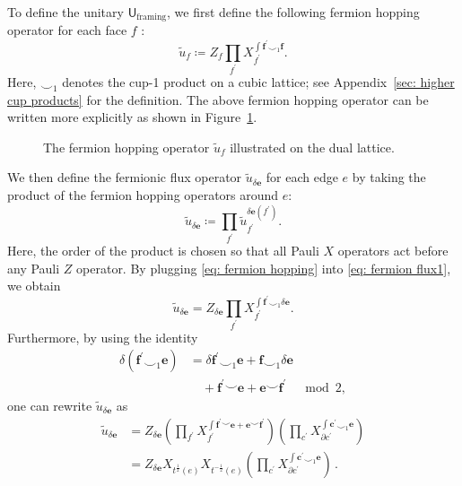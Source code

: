 \documentclass[aps,twocolumn,prx,floatfix,preprintnumbers, nofootinbib,10pt]{revtex4-2}
\numberwithin{equation}{section}
\theoremstyle{definition}
\theoremstyle{remark}
\theoremstyle{claim}
\renewcommand{\sf}[1]{\mathsf{#1}}
\begin{document}
To define the unitary $\sf{U}_{\text{framing}}$, we first define the following fermion hopping operator for each face $f$ \cite{Chen:2018nog, Shirley_2022}:
\begin{equation}
\tilde{u}_f \coloneq Z_f \prod_{f^{\prime}} X_{f^{\prime}}^{\int \bm{f}^{\prime} \smile_1 \bm{f}}.
\label{eq: fermion hopping}
\end{equation}
Here, $\smile_1$ denotes the cup-1 product on a cubic lattice; see Appendix~\ref{sec: higher cup products} for the definition.
The above fermion hopping operator can be written more explicitly as shown in Figure~\ref{fig: fermion hopping}.
\begin{figure}[t]
\centering
{}
\caption{The fermion hopping operator $\tilde{u}_f$ illustrated on the dual lattice.}
\label{fig: fermion hopping}
\end{figure}
We then define the fermionic flux operator $\tilde{u}_{\delta \bm{e}}$ for each edge $e$ by taking the product of the fermion hopping operators around $e$:
\begin{equation}
\tilde{u}_{\delta \bm{e}} \coloneq \prod_{f^{\prime}} \tilde{u}_{f^{\prime}}^{\delta \bm{e}(f^{\prime})}.
\label{eq: fermion flux1}
\end{equation}
Here, the order of the product is chosen so that all Pauli $X$ operators act before any Pauli $Z$ operator.
By plugging \eqref{eq: fermion hopping} into \eqref{eq: fermion flux1}, we obtain
\begin{equation}
\tilde{u}_{\delta \bm{e}} = Z_{\delta \bm{e}} \prod_{f^{\prime}} X_{f^{\prime}}^{\int \bm{f}^{\prime} \smile_1 \delta \bm{e}}.
\end{equation}
Furthermore, by using the identity
\begin{equation}
\begin{aligned}
\delta(\bm{f}^{\prime} \smile_1 \bm{e}) &= \delta \bm{f}^{\prime} \smile_1 \bm{e} + \bm{f} \smile_1 \delta \bm{e} \\
& \quad + \bm{f}^{\prime} \smile \bm{e} + \bm{e} \smile \bm{f}^{\prime} \quad \bmod 2,
\end{aligned}
\label{eq: cup-1 Leibniz}
\end{equation}
one can rewrite $\tilde{u}_{\delta \bm{e}}$ as
\begin{align}\label{eq: tilde u}
 \tilde{u}_{\delta \bm{e}}
 &= Z_{\delta \bm{e}} \left(\prod_{f^{\prime}} X_{f^{\prime}}^{\int \bm{f}^{\prime} \smile \bm{e} + \bm{e} \smile \bm{f}^{\prime}}\right) \left(\prod_{c^{\prime}} X_{\partial c^{\prime}}^{\int \bm{c}^{\prime} \smile_1 \bm{e}}\right) \nonumber \\
 &= Z_{\delta \bm{e}} X_{t^{\frac{1}{2}}(e)} X_{t^{-\frac{1}{2}}(e)} \left(\prod_{c^{\prime}} X_{\partial c^{\prime}}^{\int \bm{c}^{\prime} \smile_1 \bm{e}}\right) \,.
\end{align}
\end{document}
